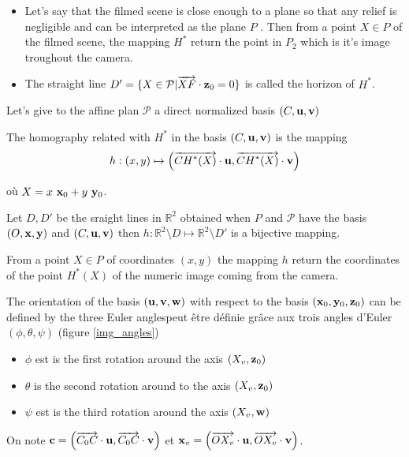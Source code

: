 \begin{remarque}
\begin{itemize}
\item Let's say that the filmed scene is close enough to a plane so that any relief is negligible and can be interpreted as the plane $P$ . Then from a point $X\in P$ of the filmed scene, the mapping $H^*$ return the point in $P_2$ which is it's image troughout the camera.
\item The straight line $D'=\{ X \in \mathcal{P} | \overrightarrow{XF} \cdot \mathbf{z}_0 =0 \}$ is called the horizon of $H^*$.
\end{itemize}

\end{remarque}
Let's give to the affine plan $\mathcal{P}$ a direct normalized basis $(C,\mathbf{u},\mathbf{v})$ 
\begin{Def}
 The homography related with $H^*$ in the basis $(C,\mathbf{u},\mathbf{v})$ is the mapping
\begin{equation}
h : (x,y)  \mapsto \left( \overrightarrow{CH^*(X)}\cdot \mathbf{u} , \overrightarrow{CH^*(X)}\cdot \mathbf{v} \right)
\label{formule_homographie_H}
\end{equation}


où $X=x~\mathbf{x}_0 + y~\mathbf{y}_0 $.
\label{def_homographie_H}
\end{Def}
Let $D,D'$ be the sraight lines in $\mathbb{R}^2$ obtained when $P$ and $\mathcal{P}$ have the basis $(O,\mathbf{x},\mathbf{y})$ and $(C,\mathbf{u},\mathbf{v})$ then $h:\mathbb{R}^2  \setminus D \mapsto \mathbb{R}^2  \setminus D'$ is a bijective mapping.
\begin{remarque}
From a point $X\in P$ of coordinates $(x,y)$  the mapping $h$ return the coordinates of the point $H^*(X)$ of the numeric image coming from the camera. 
\end{remarque}
The orientation of the basis $(\mathbf{u},\mathbf{v},\mathbf{w})$ with respect to the basis $(\mathbf{x}_0,\mathbf{y}_0,\mathbf{z}_0)$ can be defined by the three Euler anglespeut être définie grâce aux trois angles d'Euler $(\phi , \theta ,\psi )$ (figure \ref{img_angles})
\begin{itemize}
\item $\phi$ est is the first rotation around the axis $(X_v ,\mathbf{z}_0)$
\item $\theta$ is the second rotation around to the axis $(X_v , \mathbf{z}_0 )$
\item $\psi$ est is the third rotation around the axis $(X_v , \mathbf{w} )$
\end{itemize}
On note $\mathbf{c}= \left (\overrightarrow{C_0 C}\cdot \mathbf{u} , \overrightarrow{C_0 C}\cdot \mathbf{v} \right)$ et $\mathbf{x}_v=\left( \overrightarrow{O X_v}\cdot \mathbf{u} , \overrightarrow{O X_v}\cdot \mathbf{v} \right )$.\\
